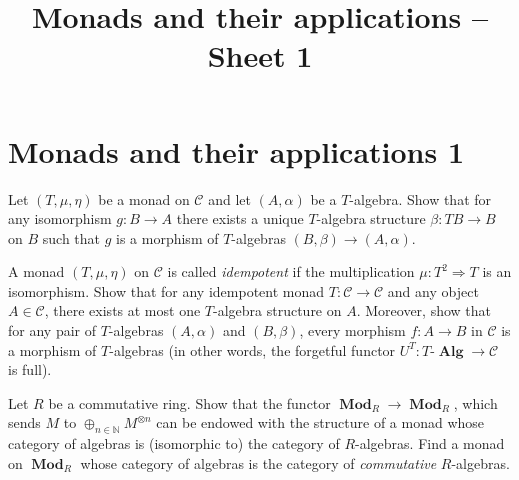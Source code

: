 \documentclass[12pt, a4paper]{article}
\date{}
\title{Monads and their applications -- Sheet 1}
\DeclareMathOperator{\Mod}{\mathbf{Mod}}
\DeclareMathOperator{\Alg}{\mathbf{Alg}}
\newcommand{\ca}[1]{\mathscr{#1}}
\theoremstyle{plain}
\theoremstyle{definition}
\theoremstyle{citing}
\theoremstyle{citingdfn}
\numberwithin{equation}{section}
\begin{document}

\pagestyle{empty}
\section*{Monads and their applications 1}

\begin{question} 
  Let $(T, \mu, \eta)$ be a monad on $\ca{C}$ and let $(A,\alpha)$ be a $T$-algebra. Show that for any isomorphism $g \colon B \rightarrow A$ there exists a unique $T$-algebra structure $\beta \colon TB \rightarrow B$ on $B$ such that $g$ is a morphism of $T$-algebras $(B,\beta) \rightarrow (A,\alpha)$.
\end{question}

\begin{question}
 A monad $(T,  \mu, \eta)$ on $\ca{C}$ is called \emph{idempotent} if the multiplication $\mu \colon T^2 \Rightarrow T$ is an isomorphism. Show that for any idempotent monad $T \colon \ca{C} \rightarrow \ca{C}$ and any object $A \in \ca{C}$, there exists at most one $T$-algebra structure on $A$. Moreover, show that for any pair of $T$-algebras $(A, \alpha)$ and $(B,\beta)$, every morphism  $f \colon A \rightarrow B$ in $\ca{C}$ is a morphism of $T$-algebras (in other words, the forgetful functor $U^{T} \colon T\mbox{-}\Alg \rightarrow \ca{C}$ is full).
\end{question}

\begin{question}
 Let $R$ be a commutative ring. Show that the functor $\Mod_R \rightarrow \Mod_R$, which sends $M$ to $\oplus_{n \in \mathbb{N}} M^{\otimes n}$ can be endowed with the structure of a monad whose category of algebras is (isomorphic to) the category of $R$-algebras. Find a monad on $\Mod_R$ whose category of algebras is the category of \emph{commutative} $R$-algebras.
\end{question}
\end{document}
